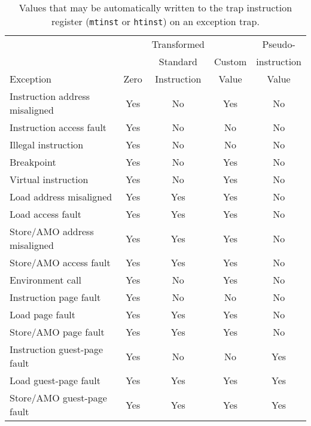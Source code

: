 \begin{table*}[h!]
\begin{center}
\begin{tabular}{|l|c|c|c|c|}
\hline
                               &      & Transformed &        & Pseudo- \\
                               &      & Standard    & Custom & instruction \\
Exception                      & Zero & Instruction & Value  & Value \\
\hline
Instruction address misaligned & Yes  & No          & Yes    & No  \\
\hline
Instruction access fault       & Yes  & No          & No     & No  \\
Illegal instruction            & Yes  & No          & No     & No  \\
Breakpoint                     & Yes  & No          & Yes    & No  \\
Virtual instruction            & Yes  & No          & Yes    & No  \\
\hline
Load address misaligned        & Yes  & Yes         & Yes    & No  \\
Load access fault              & Yes  & Yes         & Yes    & No  \\
Store/AMO address misaligned   & Yes  & Yes         & Yes    & No  \\
Store/AMO access fault         & Yes  & Yes         & Yes    & No  \\
\hline
Environment call               & Yes  & No          & Yes    & No  \\
\hline
Instruction page fault         & Yes  & No          & No     & No  \\
Load page fault                & Yes  & Yes         & Yes    & No  \\
Store/AMO page fault           & Yes  & Yes         & Yes    & No  \\
\hline
Instruction guest-page fault   & Yes  & No          & No     & Yes \\
Load guest-page fault          & Yes  & Yes         & Yes    & Yes \\
Store/AMO guest-page fault     & Yes  & Yes         & Yes    & Yes \\
\hline
\end{tabular}
\end{center}
\caption{Values that may be automatically written to the trap instruction
register ({\tt mtinst} or {\tt htinst}) on an exception trap.}
\label{tab:tinst-values}
\end{table*}

